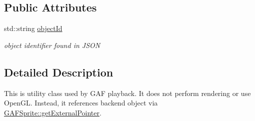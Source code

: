 \subsection*{Public Attributes}
\begin{DoxyCompactItemize}
\item 
\hypertarget{class_g_a_f_1_1_g_a_f_sprite_a3bdfe86142a3ebc48942f1736ced9b21}{std\-::string \hyperlink{class_g_a_f_1_1_g_a_f_sprite_a3bdfe86142a3ebc48942f1736ced9b21}{object\-Id}}\label{class_g_a_f_1_1_g_a_f_sprite_a3bdfe86142a3ebc48942f1736ced9b21}

\begin{DoxyCompactList}\small\item\em object identifier found in J\-S\-O\-N \end{DoxyCompactList}\end{DoxyCompactItemize}


\subsection{Detailed Description}
This is utility class used by G\-A\-F playback. It does not perform rendering or use Open\-G\-L. Instead, it references backend object via \hyperlink{class_g_a_f_1_1_g_a_f_sprite_a06cbb88c161385cf028fef400d320f0d}{G\-A\-F\-Sprite\-::get\-External\-Pointer}. 

